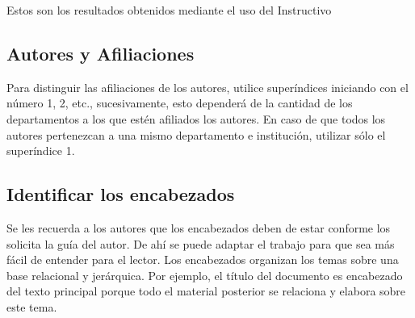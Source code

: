     Estos son los resultados obtenidos mediante el uso del Instructivo
    \newpage
    \label{anexo:evidencias}
    
    
    
    \subsection{Autores y Afiliaciones}
    
    Para distinguir las afiliaciones de los autores, utilice superíndices iniciando con el número 1, 2, etc., sucesivamente, esto dependerá de la cantidad de los departamentos a los que estén afiliados los autores. En caso de que todos los autores pertenezcan a una mismo departamento e institución, utilizar sólo el superíndice 1. 
    
    \subsection{Identificar los encabezados}
    
    Se les recuerda a los autores que los encabezados deben de estar conforme los solicita la guía del autor. De ahí se puede adaptar el trabajo para que sea más fácil de entender para el lector.
    Los encabezados organizan los temas sobre una base relacional y jerárquica. Por ejemplo, el título del documento es encabezado del texto principal porque todo el material posterior se relaciona y elabora sobre este tema. 
    
